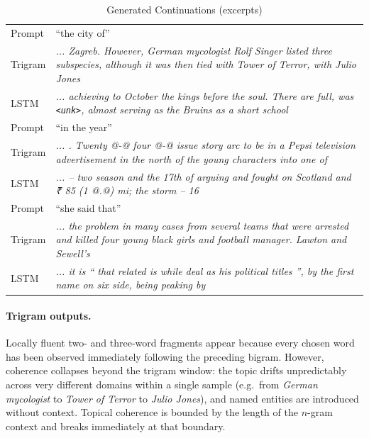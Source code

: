 \begin{table}[h]
\centering
\caption{Generated Continuations (excerpts)}
\label{tab:q5_gen}
\small
\begin{tabular}{p{}p{}}
\toprule
Prompt    & ``the city of'' \\
Trigram   & \textit{... Zagreb. However, German mycologist Rolf Singer listed three subspecies, although it was then tied with Tower of Terror, with Julio Jones} \\
LSTM      & \textit{... achieving to October the kings before the soul. There are full, was \texttt{<unk>}, almost serving as the Bruins as a short school} \\
\midrule
Prompt    & ``in the year'' \\
Trigram   & \textit{... . Twenty @-@ four @-@ issue story arc to be in a Pepsi television advertisement in the north of the young characters into one of} \\
LSTM      & \textit{... – two season and the 17th of arguing and fought on Scotland and ₹ 85 (1 @.@) mi; the storm – 16} \\
\midrule
Prompt    & ``she said that'' \\
Trigram   & \textit{... the problem in many cases from several teams that were arrested and killed four young black girls and football manager. Lawton and Sewell's} \\
LSTM      & \textit{... it is `` that related is while deal as his political titles '', by the first name on six side, being peaking by} \\
\bottomrule
\end{tabular}
\end{table}

\paragraph{Trigram outputs.}
Locally fluent two- and three-word fragments appear because every chosen
word has been observed immediately following the preceding bigram.
However, coherence collapses beyond the trigram window: the topic
drifts unpredictably across very different domains within a single
sample (e.g.\ from \textit{German mycologist} to \textit{Tower of
Terror} to \textit{Julio Jones}), and named entities are introduced
without context. Topical coherence is bounded by the length of the
$n$-gram context and breaks immediately at that boundary.

